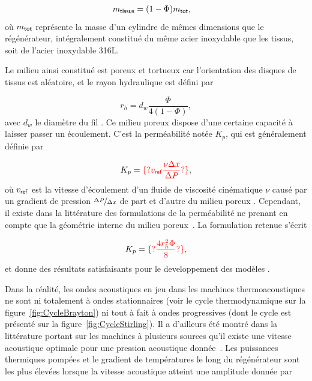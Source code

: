 \begin{align}
	m_{\sf tissus} &= (1-\Phi) m_{\sf tot}, \label{eq:MasseTissus_Porosite}
\end{align}
où $m_{\sf tot}$ représente la masse d'un cylindre de mêmes dimensions que le régénérateur, intégralement constitué du même acier inoxydable que les tissus, soit de l'acier inoxydable 316L.

Le milieu ainsi constitué est poreux et tortueux car l'orientation des disques de tissus est aléatoire, et le rayon hydraulique est défini par  %

\begin{equation}
	r_h = d_w\frac{\Phi}{4(1-\Phi)},
	\label{eq:DefRayonHydrauGantois}
\end{equation}
avec $d_w$ le diamètre du fil \cite{swift_thermoacoustics_2017}. Ce milieu poreux dispose d'une certaine capacité à laisser passer un écoulement. C'est la perméabilité notée $K_p$, qui est généralement définie par 

\begin{equation}
	K_p = \textcolor{red}{\{?v_{\sf ref}\frac{\nu \Delta x}{\Delta P}?\}},
	\label{eq:DefPermeabilite_Wikipedia}
\end{equation}
où $v_{\sf ref}$ est la vitesse d'écoulement d'un fluide de viscosité cinématique $\nu$ causé par un gradient de pression $\nicefrac{\Delta P}{\Delta x}$ de part et d'autre du milieu poreux \cite{nield_convection_2013}. Cependant, il existe dans la littérature des formulations de la perméabilité ne prenant en compte que la géométrie interne du milieu poreux~\cite{dullien_porous_1992}. La formulation retenue s'écrit

\begin{equation}
	K_p = \textcolor{red}{\{?\frac{4 r_h^2 \Phi}{8}?\}},
	\label{eq:DefPermeabilite_LISN}
\end{equation}
et donne des résultats satisfaisants pour le developpement des modèles \cite{hireche_experimental_2020}.\bigskip

Dans la réalité, les ondes acoustiques en jeu dans les machines thermoacoustiques ne sont ni totalement \og à ondes stationnaires \fg{} (voir le cycle thermodynamique sur la figure~\ref{fig:CycleBrayton}) ni tout à fait \og à ondes progressives \fg{} (dont le cycle est présenté sur la figure~\ref{fig:CycleStirling}). Il a d'ailleurs été montré dans la littérature portant sur les machines à plusieurs sources qu'il existe une vitesse acoustique optimale pour une pression acoustique donnée~\cite{poignand_etude_2006}. Les puissances thermiques pompées et le gradient de températures le long du régénérateur sont les plus élevées lorsque la vitesse acoustique atteint une amplitude donnée par

